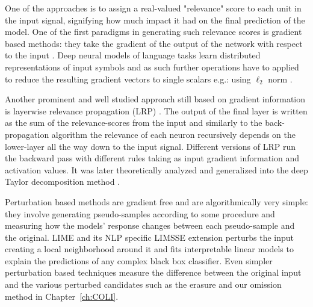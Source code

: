 One of the approaches is to assign a real-valued "relevance" score to each unit in the input signal,
signifying how much impact it had on the final prediction of the model.
One of the first paradigms in generating such relevance scores is gradient based methods:
they take the gradient of the output of the network with respect to the input \cite{simonyan2013deep}.
Deep neural models of language tasks learn distributed representations of input symbols
and as such further operations have to applied to reduce the resulting gradient vectors to
single scalars e.g.: using $\ell_2$ norm \citep{bansal2016ask}.

Another prominent and well studied
approach still based on gradient information is layerwise
relevance propagation (LRP) \citep{bach2015pixel}. The output of the final layer
is written as the sum of the relevance-scores from the input and similarly to the back-propagation
algorithm the relevance of each neuron
recursively depends on the lower-layer all the way down to the input signal.
Different versions of LRP run the backward pass with different rules taking as
input gradient information and activation values. It was later theoretically analyzed and generalized
into the deep Taylor decomposition method \citep{binder2016layer}.


Perturbation based methods are gradient free and are algorithmically very simple: they involve generating
pseudo-samples according to some procedure and measuring how the models' response changes
between each pseudo-sample and the original.
LIME \citep{ribeiro2016should} and its NLP specific LIMSSE extension
\citep{poerner2018evaluating} perturbs
the input creating a local neighborhood around it and fits interpretable linear models to explain
the predictions of any complex black box classifier.
Even simpler perturbation based techniques measure the
difference between the original input and the various perturbed candidates such as the erasure
\citep{li2016understanding} and our omission \citep{Kadar2016} method in Chapter~\ref{ch:COLI}.

